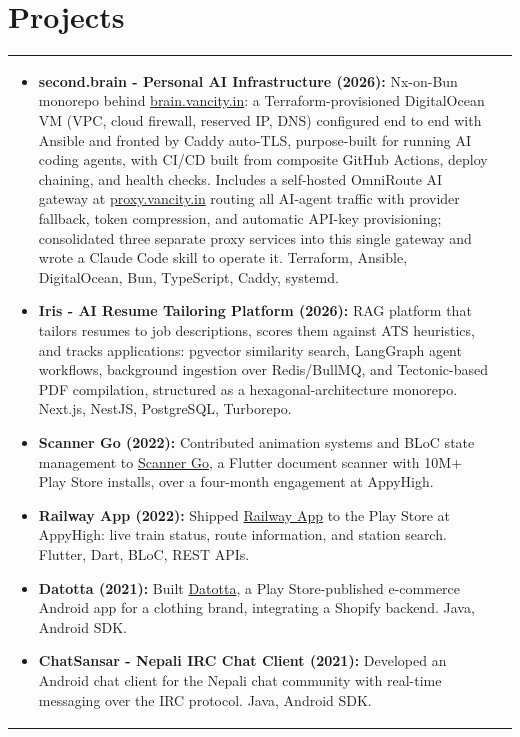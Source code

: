 \documentclass[a4paper,8pt]{article}
\begin{document}
\section{Projects}
\begin{tabularx}{\linewidth}{ @{}l r@{} }
\begin{minipage}[t]{\linewidth}
    \begin{itemize}[nosep,after=\strut, leftmargin=2em, itemsep=2pt]
        \item \textbf{second.brain - Personal AI Infrastructure (2026):} Nx-on-Bun monorepo behind \href{https://brain.vancity.in}{brain.vancity.in}: a Terraform-provisioned DigitalOcean VM (VPC, cloud firewall, reserved IP, DNS) configured end to end with Ansible and fronted by Caddy auto-TLS, purpose-built for running AI coding agents, with CI/CD built from composite GitHub Actions, deploy chaining, and health checks. Includes a self-hosted OmniRoute AI gateway at \href{https://proxy.vancity.in}{proxy.vancity.in} routing all AI-agent traffic with provider fallback, token compression, and automatic API-key provisioning; consolidated three separate proxy services into this single gateway and wrote a Claude Code skill to operate it. Terraform, Ansible, DigitalOcean, Bun, TypeScript, Caddy, systemd.
        \item \textbf{Iris - AI Resume Tailoring Platform (2026):} RAG platform that tailors resumes to job descriptions, scores them against ATS heuristics, and tracks applications: pgvector similarity search, LangGraph agent workflows, background ingestion over Redis/BullMQ, and Tectonic-based PDF compilation, structured as a hexagonal-architecture monorepo. Next.js, NestJS, PostgreSQL, Turborepo.
        \item \textbf{Scanner Go (2022):} Contributed animation systems and BLoC state management to \href{https://play.google.com/store/apps/details?id=com.cam.scanner.camscanner.documentscanner}{Scanner Go}, a Flutter document scanner with 10M+ Play Store installs, over a four-month engagement at AppyHigh.
        \item \textbf{Railway App (2022):} Shipped \href{https://play.google.com/store/apps/details?id=railway.app.train.status}{Railway App} to the Play Store at AppyHigh: live train status, route information, and station search. Flutter, Dart, BLoC, REST APIs.
        \item \textbf{Datotta (2021):} Built \href{https://play.google.com/store/apps/details?id=com.datotta}{Datotta}, a Play Store-published e-commerce Android app for a clothing brand, integrating a Shopify backend. Java, Android SDK.
        \item \textbf{ChatSansar - Nepali IRC Chat Client (2021):} Developed an Android chat client for the Nepali chat community with real-time messaging over the IRC protocol. Java, Android SDK.
    \end{itemize}
    \end{minipage}
\end{tabularx}\\[3pt]
\end{document}
